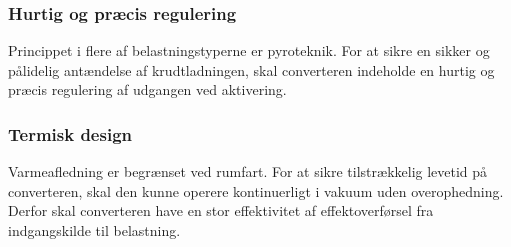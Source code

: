 \subsubsection*{Hurtig og præcis regulering}
\noindent Princippet i flere af belastningstyperne er pyroteknik. For at sikre en sikker og pålidelig antændelse af krudtladningen, skal converteren indeholde en hurtig og præcis regulering af udgangen ved aktivering. 

\subsubsection*{Termisk design}
\noindent Varmeafledning er begrænset ved rumfart. For at sikre tilstrækkelig levetid på converteren, skal den kunne operere kontinuerligt i vakuum uden overophedning. Derfor skal converteren have en stor effektivitet af effektoverførsel fra indgangskilde til belastning. 

